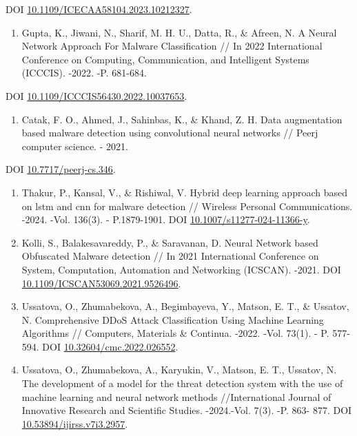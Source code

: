 DOI
\href{https://doi.org/10.1109/ICECAA58104.2023.10212327}{10.1109/ICECAA58104.2023.10212327}.

\begin{enumerate}
\def\labelenumi{\arabic{enumi}.}
\setcounter{enumi}{15}
\item
  Gupta, K., Jiwani, N., Sharif, M. H. U., Datta, R., \& Afreen, N. A
  Neural Network Approach For Malware Classification // In 2022
  International Conference on Computing, Communication, and Intelligent
  Systems (ICCCIS). -2022. -P. 681-684.
\end{enumerate}

DOI
\href{https://doi.org/10.1109/ICCCIS56430.2022.10037653}{10.1109/ICCCIS56430.2022.10037653}.

\begin{enumerate}
\def\labelenumi{\arabic{enumi}.}
\setcounter{enumi}{16}
\item
  Catak, F. O., Ahmed, J., Sahinbas, K., \& Khand, Z. H. Data
  augmentation based malware detection using convolutional neural
  networks // Peerj computer science. - 2021.
\end{enumerate}

DOI \href{https://doi.org/10.7717/peerj-cs.346}{10.7717/peerj-cs.346}.

\begin{enumerate}
\def\labelenumi{\arabic{enumi}.}
\setcounter{enumi}{17}
\item
  Thakur, P., Kansal, V., \& Rishiwal, V. Hybrid deep learning approach
  based on lstm and cnn for malware detection // Wireless Personal
  Communications. -2024. -Vol. 136(3). - P.1879-1901. DOI
  \href{https://doi.org/10.1007/s11277-024-11366-y}{10.1007/s11277-024-11366-y}.
\item
  Kolli, S., Balakesavareddy, P., \& Saravanan, D. Neural Network based
  Obfuscated Malware detection // In 2021 International Conference on
  System, Computation, Automation and Networking (ICSCAN). -2021. DOI
  \href{https://doi.org/10.1109/ICSCAN53069.2021.9526496}{10.1109/ICSCAN53069.2021.9526496}.
\item
  Ussatova, O., Zhumabekova, A., Begimbayeva, Y., Matson, E. T., \&
  Ussatov, N. Comprehensive DDoS Attack Classification Using Machine
  Learning Algorithms // Computers, Materials \& Continua. -2022. -Vol.
  73(1). - P. 577-594. DOI
  \href{https://doi.org/10.32604/cmc.2022.026552}{10.32604/cmc.2022.026552}.
\item
  Ussatova, O., Zhumabekova, A., Karyukin, V., Matson, E. T., Ussatov,
  N. The development of a model for the threat detection system with the
  use of machine learning and neural network methods //International
  Journal of Innovative Research and Scientific Studies. -2024.-Vol.
  7(3). -P. 863- 877. DOI
  \href{https://doi.org/10.53894/ijirss.v7i3.2957}{10.53894/ijirss.v7i3.2957}.
\end{enumerate}

